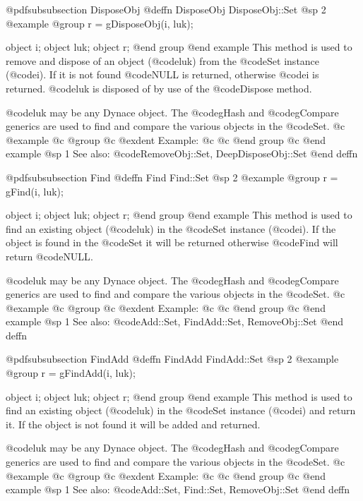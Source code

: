 @pdfsubsubsection {DisposeObj}
@deffn {DisposeObj} DisposeObj::Set
@sp 2
@example
@group
r = gDisposeObj(i, luk);

object  i;
object  luk;
object  r;
@end group
@end example
This method is used to remove and dispose of an object (@code{luk}) from
the @code{Set} instance (@code{i}).  If it is not found @code{NULL} is returned,
otherwise @code{i} is returned.  @code{luk} is disposed of by use of the
@code{Dispose} method.

@code{luk} may be any Dynace object.  The @code{gHash} and
@code{gCompare} generics are used to find and compare the various
objects in the @code{Set}.
@c @example
@c @group
@c @exdent Example:
@c 
@c @end group
@c @end example
@sp 1
See also:  @code{RemoveObj::Set, DeepDisposeObj::Set}
@end deffn



















@pdfsubsubsection {Find}
@deffn {Find} Find::Set
@sp 2
@example
@group
r = gFind(i, luk);

object  i;
object  luk;
object  r;
@end group
@end example
This method is used to find an existing object (@code{luk}) in the
@code{Set} instance (@code{i}).  If the object is found in
the @code{Set} it will be returned otherwise @code{Find} will return @code{NULL}.

@code{luk} may be any Dynace object.  The @code{gHash} and
@code{gCompare} generics are used to find and compare the various
objects in the @code{Set}.
@c @example
@c @group
@c @exdent Example:
@c 
@c @end group
@c @end example
@sp 1
See also:  @code{Add::Set, FindAdd::Set, RemoveObj::Set}
@end deffn










@pdfsubsubsection {FindAdd}
@deffn {FindAdd} FindAdd::Set
@sp 2
@example
@group
r = gFindAdd(i, luk);

object  i;
object  luk;
object  r;
@end group
@end example
This method is used to find an existing object (@code{luk}) in the @code{Set}
instance (@code{i}) and return it.  If the object is not found it will
be added and returned.  

@code{luk} may be any Dynace object.  The @code{gHash} and
@code{gCompare} generics are used to find and compare the various
objects in the @code{Set}.
@c @example
@c @group
@c @exdent Example:
@c 
@c @end group
@c @end example
@sp 1
See also:  @code{Add::Set, Find::Set, RemoveObj::Set}
@end deffn




















